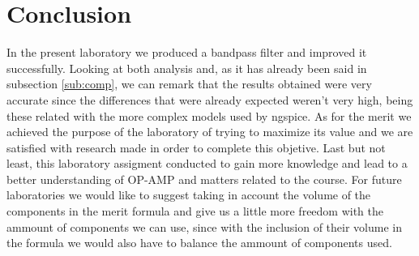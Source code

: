 \newpage
\section{Conclusion}
\label{sec:conclusion}


In the present laboratory we produced a bandpass filter and improved it successfully.
Looking at both analysis and, as it has already been said in subsection \ref{sub:comp}, we can remark that the results obtained were very accurate since the differences that
were already expected weren't very high, being these related with the more complex models used by ngspice.%
As for the merit we achieved the purpose of the laboratory of trying to maximize its value and we are satisfied with research made in order to complete this objetive.
Last but not least, this laboratory assigment conducted to gain more knowledge and lead to a better understanding of OP-AMP and matters related to the course.
For future laboratories we would like to suggest taking in account the volume of the components in the merit formula and give us a little more freedom with the ammount of components we can use, since with the inclusion of their volume in the formula we would also have to balance the ammount of components used.









